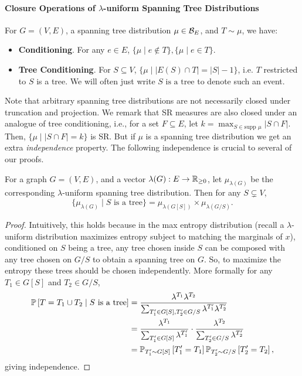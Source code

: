 \paragraph{Closure Operations of $\lambda$-uniform Spanning Tree Distributions}
For $G=(V,E)$, a spanning tree distribution $\mu\in {\cal B}_E$, and $T \sim \mu$, we have:
\begin{itemize}
	\item {\bf Conditioning}. For any $e\in E$, $\{\mu \mid e \not\in T\}, \{\mu \mid e \in T\}$. 
	\item {\bf Tree Conditioning}. For $S\subseteq V$, $\{\mu \mid |E(S) \cap T| = |S|-1\}$, i.e. $T$ restricted to $S$ is a tree. We will often just write $S\text{ is a tree}$ to denote such an event.
\end{itemize}
Note that arbitrary spanning tree distributions are not necessarily closed under truncation and projection. 
We remark that SR measures are also closed under an analogue of tree conditioning, i.e., for a set $F\subseteq E$, let $k=\max_{S\in\text{supp }\mu} |S\cap F|$. Then, $\{\mu \mid |S\cap F|=k\}$ is SR. But if $\mu$ is a spanning tree distribution we get an extra {\em independence} property. The following independence is crucial to several of our proofs.
\begin{fact}
\label{fact:treeIndep}
For a graph $G = (V,E)$, and a vector $\lambda (G): E\rightarrow \mathbb{R} _{\ge 0}$, let $\mu_{\lambda(G)}$ be the corresponding $\lambda$-uniform spanning tree distribution.
Then for any $S\subsetneq V$, 
	$$\{\mu_{\lambda(G)} \mid S\text{ is a tree}\} = \mu_{\lambda(G[S])} \times  \mu_{\lambda(G/S)}.$$ 
\end{fact}
\begin{proof}
	Intuitively, this holds because in the max entropy distribution (recall a $\lambda$-uniform distribution maximizes entropy subject to matching the marginals of $x$), conditioned on $S$ being a tree, any tree chosen inside $S$ can be composed with any tree chosen on $G/S$ to obtain a spanning tree on $G$. So, to maximize the entropy these trees should be chosen independently. %
	More formally for any $T_1 \in G[S]$ and $T_2 \in G/S$, 
	\begin{align*}
	{\mathbb{P}}\left[T=T_1\cup T_2 \mid S\text{ is a tree}\right] &= \frac{\lambda^{T_1}\lambda^{T_2}}{\sum_{T'_1 \in G[S],T'_2 \in G/S} \lambda^{T'_1}\lambda^{T'_2}} \\ 
	&= \frac{\lambda^{T_1}}{\sum_{T'_1 \in G[S]} \lambda^{T'_1}} \cdot \frac{\lambda^{T_2}}{\sum_{T'_2 \in G/S} \lambda^{T'_2}} \\
	&= {\mathbb{P}}_{T'_1 \sim G[S]}\left[T'_1 = T_1\right]{\mathbb{P}}_{T'_2 \sim G/S}\left[T'_2 = T_2\right],
	\end{align*}
giving independence.
\end{proof}



